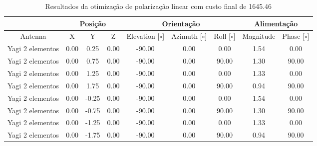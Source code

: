 \begin{table}[H]
    \centering
    \tiny
    \begin{tabular}{c|c|c|c|c|c|c|c|c}
         & \multicolumn{3}{|c|}{Posição} & \multicolumn{3}{|c|}{Orientação} & \multicolumn{2}{|c}{Alimentação} \\
         \hline
        Antenna & X & Y & Z & Elevation [$\circ$] & Azimuth [$\circ$] & Roll [$\circ$] & Magnitude & Phase [$\circ$] \\
        \hline
        Yagi 2 elementos & 0.00 & 0.25 & 0.00 & -90.00 & 0.00 & 0.00 & 1.54 & 0.00 \\
        Yagi 2 elementos & 0.00 & 0.75 & 0.00 & -90.00 & 0.00 & 90.00 & 1.30 & 90.00 \\
        Yagi 2 elementos & 0.00 & 1.25 & 0.00 & -90.00 & 0.00 & 0.00 & 1.33 & 0.00 \\
        Yagi 2 elementos & 0.00 & 1.75 & 0.00 & -90.00 & 0.00 & 90.00 & 0.94 & 90.00 \\
        Yagi 2 elementos & 0.00 & -0.25 & 0.00 & -90.00 & 0.00 & 0.00 & 1.54 & 0.00 \\
        Yagi 2 elementos & 0.00 & -0.75 & 0.00 & -90.00 & 0.00 & 90.00 & 1.30 & 90.00 \\
        Yagi 2 elementos & 0.00 & -1.25 & 0.00 & -90.00 & 0.00 & 0.00 & 1.33 & 0.00 \\
        Yagi 2 elementos & 0.00 & -1.75 & 0.00 & -90.00 & 0.00 & 90.00 & 0.94 & 90.00 \\
    \end{tabular}
    \caption{Resultados da otimização de polarização linear com custo final de 1645.46}
    \label{tab:Arranjo Arranjo final otimizado}
\end{table}
